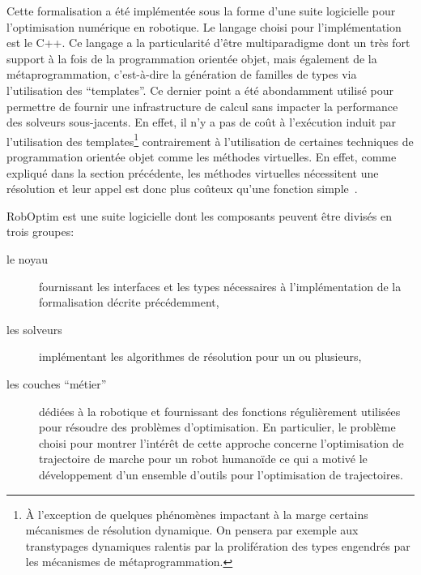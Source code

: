 Cette formalisation a été implémentée sous la forme d'une suite
logicielle pour l'optimisation numérique en robotique. Le langage
choisi pour l'implémentation est le C++. Ce langage a la particularité
d'être multiparadigme dont un très fort support à la fois de la
programmation orientée objet, mais également de la
métaprogrammation, c'est-à-dire la génération
de familles de types via l'utilisation des ``templates''. Ce dernier
point a été abondamment utilisé pour permettre de fournir une
infrastructure de calcul sans impacter la performance des solveurs
sous-jacents. En effet, il n'y a pas de coût à l'exécution induit par
l'utilisation des templates\footnote{À l'exception de quelques
  phénomènes impactant à la marge certains mécanismes de résolution
  dynamique. On pensera par exemple aux transtypages dynamiques
  ralentis par la prolifération des types engendrés par les mécanismes
  de métaprogrammation.} contrairement à l'utilisation de certaines
techniques de programmation orientée objet comme les méthodes
virtuelles. En effet, comme expliqué dans la section précédente, les
méthodes virtuelles nécessitent une résolution et leur appel est donc
plus coûteux qu'une fonction simple \citep{driesen1996direct}.


RobOptim est une suite logicielle dont les composants
peuvent être divisés en trois groupes:
\begin{description}
\item[le noyau] fournissant les interfaces et les types nécessaires à
  l'implémentation de la formalisation décrite précédemment,
\item[les solveurs] implémentant les algorithmes de résolution pour un ou plusieurs,
\item[les couches ``métier''] dédiées à la
  robotique et fournissant des fonctions régulièrement utilisées pour
  résoudre des problèmes d'optimisation. En particulier, le problème
  choisi pour montrer l'intérêt de cette approche concerne
  l'optimisation de trajectoire de marche pour un robot humanoïde ce
  qui a motivé le développement d'un ensemble d'outils pour
  l'optimisation de trajectoires.
\end{description}

